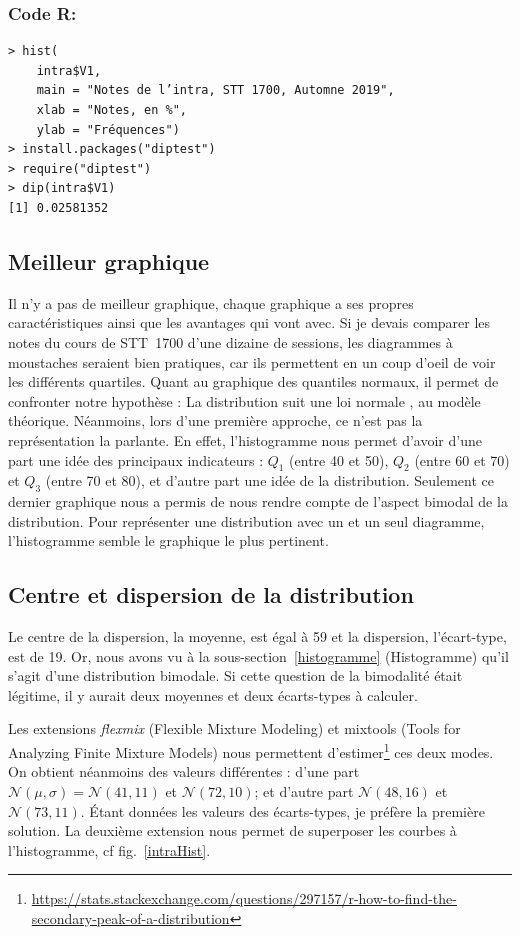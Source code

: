 \documentclass[10pt,twocolumn]{article}
\begin{document}
\subsubsection*{Code R:}
\begin{verbatim}
> hist(
    intra$V1,
    main = "Notes de l’intra, STT 1700, Automne 2019",
    xlab = "Notes, en %",
    ylab = "Fréquences")
> install.packages("diptest")
> require("diptest")
> dip(intra$V1)
[1] 0.02581352
\end{verbatim}


\subsection{Meilleur graphique}
Il n’y a pas de meilleur graphique, chaque graphique a ses propres caractéristiques ainsi que les avantages qui vont avec. Si je devais comparer les notes du cours de STT~1700 d’une dizaine de sessions, les diagrammes à moustaches seraient bien pratiques, car ils permettent en un coup d’oeil de voir les différents quartiles. Quant au graphique des quantiles normaux, il permet de confronter notre hypothèse : \og La distribution suit une loi normale \fg{}, au modèle théorique. Néanmoins, lors d’une première approche, ce n’est pas la représentation la parlante. En effet, l’histogramme nous permet d’avoir d’une part une idée des principaux indicateurs : $Q_{1}$ (entre 40 et 50), $Q_{2}$ (entre 60 et 70) et $Q_{3}$ (entre 70 et 80), et d’autre part une idée de la distribution. Seulement ce dernier graphique nous a permis de nous rendre compte de l’aspect bimodal de la distribution. Pour représenter une distribution avec un et un seul diagramme, l’histogramme semble le graphique le plus pertinent.


\subsection{Centre et dispersion de la distribution}
Le centre de la dispersion, la moyenne, est égal à 59 et la dispersion, l’écart-type, est de 19. Or, nous avons vu à la sous-section~\ref{histogramme} (Histogramme) qu’il s’agit d’une distribution bimodale. Si cette question de la bimodalité était légitime, il y aurait deux moyennes et deux écarts-types à calculer.

Les extensions \textit{flexmix} (Flexible Mixture Modeling) et mixtools (Tools for Analyzing Finite Mixture Models) nous permettent d’estimer\footnote{\url{https://stats.stackexchange.com/questions/297157/r-how-to-find-the-secondary-peak-of-a-distribution}} ces deux modes. On obtient néanmoins des valeurs différentes : d’une part $\mathcal{N}(\mu,\sigma) = \mathcal{N}(41,11)$ et $\mathcal{N}(72,10)$; et d’autre part $\mathcal{N}(48,16)$ et $\mathcal{N}(73,11)$. Étant données les valeurs des écarts-types, je préfère la première solution. La deuxième extension nous permet de superposer les courbes à l’histogramme, cf fig.~\ref{intraHist}.
\end{document}
